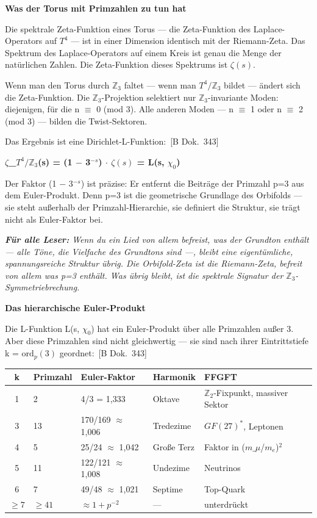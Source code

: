 \documentclass[11pt,oneside]{book}
\newcommand{\status}[1]{\penalty10000\,{\scriptsize\textcolor{gray!60}{[#1]}}}
\newenvironment{laierspur}{%
  \par\vspace{4pt}%
  \noindent\small\itshape\color{blue!60!black}%
  \textbf{Für alle Leser:}\enspace\ignorespaces}{%
  \par\vspace{4pt}\normalsize\normalfont\normalcolor}
\begin{document}
\textbf{Was der Torus mit Primzahlen zu tun hat}


Die spektrale Zeta-Funktion eines Torus — die Zeta-Funktion des Laplace-
Operators auf $T^4$ — ist in einer Dimension identisch mit der Riemann-Zeta.
Das Spektrum des Laplace-Operators auf einem Kreis ist genau die Menge
der natürlichen Zahlen. Die Zeta-Funktion dieses Spektrums ist $\zeta(s)$.


Wenn man den Torus durch $\mathbb{Z}_3$ faltet — wenn man $T^4/\mathbb{Z}_3$ bildet — ändert
sich die Zeta-Funktion. Die $\mathbb{Z}_3$-Projektion selektiert nur $\mathbb{Z}_3$-invariante
Moden: diejenigen, für die n $\equiv$ 0 (mod 3). Alle anderen Moden — n $\equiv$ 1
oder n $\equiv$ 2 (mod 3) — bilden die Twist-Sektoren.


Das Ergebnis ist eine Dirichlet-L-Funktion: \status{B Dok.~343}


\textbf{$\zeta$\_{$T^4/\mathbb{Z}_3$}(s) = (1 $-$ 3$^{-s}$) $\cdot$ $\zeta(s)$ = L(s, $\chi_0$)}


Der Faktor (1 $-$ 3$^{-s}$) ist präzise: Er entfernt die Beiträge der
Primzahl p=3 aus dem Euler-Produkt. Denn p=3 ist die geometrische
Grundlage des Orbifolds — sie steht außerhalb der Primzahl-Hierarchie,
sie definiert die Struktur, sie trägt nicht als Euler-Faktor bei.


\begin{laierspur}
Wenn du ein Lied von allem befreist, was der Grundton
enthält — alle Töne, die Vielfache des Grundtons sind —, bleibt
eine eigentümliche, spannungsreiche Struktur übrig. Die Orbifold-Zeta
ist die Riemann-Zeta, befreit von allem was p=3 enthält. Was übrig
bleibt, ist die spektrale Signatur der $\mathbb{Z}_3$-Symmetriebrechung.
\end{laierspur}

\textbf{Das hierarchische Euler-Produkt}


Die L-Funktion L(s, $\chi_0$) hat ein Euler-Produkt über alle Primzahlen
außer 3. Aber diese Primzahlen sind nicht gleichwertig — sie sind
nach ihrer Eintrittstiefe k = $\text{ord}_p(3)$ geordnet: \status{B Dok.~343}


\begin{center}
\small
\begin{tabular}{cp{1.2cm}p{2.3cm}p{1.5cm}p{2cm}}
\toprule
k & Primzahl & Euler-Faktor & Harmonik & FFGFT \\
\midrule
1 & 2 & 4/3 = 1,333 & Oktave & $\mathbb{Z}_2$-Fixpunkt, massiver Sektor \\
3 & 13 & 170/169 $\approx$ 1,006 & Tredezime & $GF(27)^*$, Leptonen \\
4 & 5 & 25/24 $\approx$ 1,042 & Große Terz & Faktor in ($m\_\mu$/$m_e$)$^2$ \\
5 & 11 & 122/121 $\approx$ 1,008 & Undezime & Neutrinos \\
6 & 7 & 49/48 $\approx$ 1,021 & Septime & Top-Quark \\
${\geq}7$ & ${\geq}41$ & ${\approx}1{+}p^{-2}$ & --- & unterdrückt \\
\bottomrule
\end{tabular}
\end{center}
\end{document}
